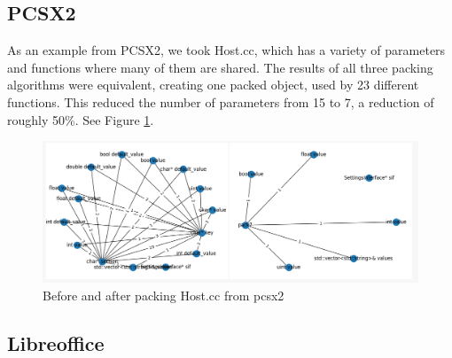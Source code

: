 \documentclass{article}
\begin{document}
\subsection{PCSX2}

As an example from PCSX2, we took Host.cc, which has a variety of parameters and functions where many of them are shared. The results of all three packing algorithms were equivalent, creating one packed object, used by 23 different functions. This reduced the number of parameters from 15 to 7, a reduction of roughly 50\%. See Figure \ref{fig:pcsx2_graph}.


\begin{figure}[ht]
    \includegraphics[width=\linewidth]{im8.png}%
    \caption{Before and after packing Host.cc from pcsx2}
    \label{fig:pcsx2_graph}
\end{figure}


\subsection{Libreoffice}
\end{document}
